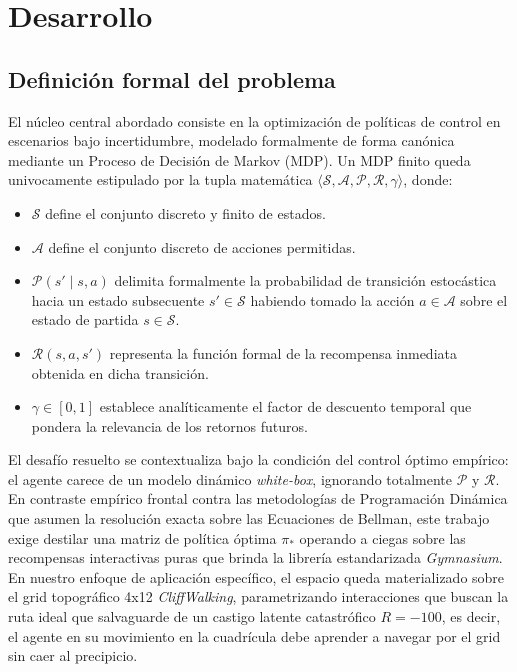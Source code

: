 \section{Desarrollo}

\subsection{Definición formal del problema}
El núcleo central abordado consiste en la optimización de políticas de control en escenarios bajo incertidumbre, modelado formalmente de forma canónica mediante un Proceso de Decisión de Markov (MDP). Un MDP finito queda univocamente estipulado por la tupla matemática $\langle \mathcal{S}, \mathcal{A}, \mathcal{P}, \mathcal{R}, \gamma \rangle$, donde:
\begin{itemize}
    \item $\mathcal{S}$ define el conjunto discreto y finito de estados.
    \item $\mathcal{A}$ define el conjunto discreto de acciones permitidas.
    \item $\mathcal{P}(s' \mid s, a)$ delimita formalmente la probabilidad de transición estocástica hacia un estado subsecuente $s' \in \mathcal{S}$ habiendo tomado la acción $a \in \mathcal{A}$ sobre el estado de partida $s \in \mathcal{S}$.
    \item $\mathcal{R}(s, a, s')$ representa la función formal de la recompensa inmediata obtenida en dicha transición.
    \item $\gamma \in [0, 1]$ establece analíticamente el factor de descuento temporal que pondera la relevancia de los retornos futuros.
\end{itemize}

El desafío resuelto se contextualiza bajo la condición del control óptimo empírico: el agente carece de un modelo dinámico \textit{white-box}, ignorando totalmente $\mathcal{P}$ y $\mathcal{R}$. En contraste empírico frontal contra las metodologías de Programación Dinámica que asumen la resolución exacta sobre las Ecuaciones de Bellman, este trabajo exige destilar una matriz de política óptima $\pi_*$ operando a ciegas sobre las recompensas interactivas puras que brinda la librería estandarizada \textit{Gymnasium}. En nuestro enfoque de aplicación específico, el espacio queda materializado sobre el grid topográfico 4x12 \textit{CliffWalking}, parametrizando interacciones que buscan la ruta ideal que salvaguarde de un castigo latente catastrófico $R = -100$, es decir, el agente en su movimiento en la cuadrícula debe aprender a navegar por el grid sin caer al precipicio. 


